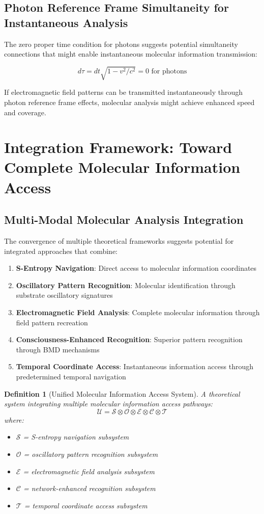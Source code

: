 \documentclass[11pt,a4paper]{article}
\newtheorem{definition}[theorem]{Definition}
\theoremstyle{remark}
\begin{document}
\subsection{Photon Reference Frame Simultaneity for Instantaneous Analysis}

The zero proper time condition for photons suggests potential simultaneity connections that might enable instantaneous molecular information transmission:

$$d\tau = dt\sqrt{1-v^2/c^2} = 0 \text{ for photons}$$

If electromagnetic field patterns can be transmitted instantaneously through photon reference frame effects, molecular analysis might achieve enhanced speed and coverage.

\section{Integration Framework: Toward Complete Molecular Information Access}

\subsection{Multi-Modal Molecular Analysis Integration}

The convergence of multiple theoretical frameworks suggests potential for integrated approaches that combine:

\begin{enumerate}
\item \textbf{S-Entropy Navigation}: Direct access to molecular information coordinates
\item \textbf{Oscillatory Pattern Recognition}: Molecular identification through substrate oscillatory signatures
\item \textbf{Electromagnetic Field Analysis}: Complete molecular information through field pattern recreation
\item \textbf{Consciousness-Enhanced Recognition}: Superior pattern recognition through BMD mechanisms
\item \textbf{Temporal Coordinate Access}: Instantaneous information access through predetermined temporal navigation
\end{enumerate}

\begin{definition}[Unified Molecular Information Access System]
A theoretical system integrating multiple molecular information access pathways:
$$\mathcal{U} = \mathcal{S} \otimes \mathcal{O} \otimes \mathcal{E} \otimes \mathcal{C} \otimes \mathcal{T}$$
where:
\begin{itemize}
\item $\mathcal{S}$ = S-entropy navigation subsystem
\item $\mathcal{O}$ = oscillatory pattern recognition subsystem  
\item $\mathcal{E}$ = electromagnetic field analysis subsystem
\item $\mathcal{C}$ = network-enhanced recognition subsystem
\item $\mathcal{T}$ = temporal coordinate access subsystem
\end{itemize}
\end{definition}
\end{document}
